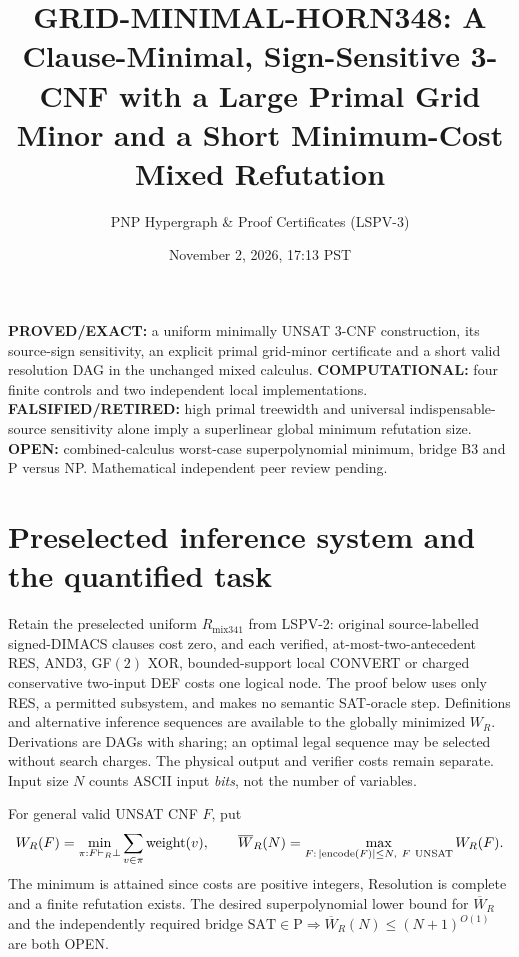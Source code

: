 \documentclass[11pt]{article}
\title{GRID-MINIMAL-HORN348: A Clause-Minimal, Sign-Sensitive 3-CNF with a Large Primal Grid Minor and a Short Minimum-Cost Mixed Refutation}
\author{PNP Hypergraph \& Proof Certificates (LSPV-3)}
\date{November 2, 2026, 17:13 PST}
\begin{document}
\maketitle
\noindent\textbf{PROVED/EXACT:} a uniform minimally UNSAT 3-CNF construction, its source-sign sensitivity, an explicit primal grid-minor certificate and a short valid resolution DAG in the unchanged mixed calculus. \textbf{COMPUTATIONAL:} four finite controls and two independent local implementations. \textbf{FALSIFIED/RETIRED:} high primal treewidth and universal indispensable-source sensitivity alone imply a superlinear global minimum refutation size. \textbf{OPEN:} combined-calculus worst-case superpolynomial minimum, bridge B3 and P versus NP. Mathematical independent peer review pending.

\section*{Preselected inference system and the quantified task}
Retain the preselected uniform $R_{\mathrm{mix341}}$ from LSPV-2: original source-labelled signed-DIMACS clauses cost zero, and each verified, at-most-two-antecedent RES, AND3, GF$(2)$ XOR, bounded-support local CONVERT or charged conservative two-input DEF costs one logical node. The proof below uses only RES, a permitted subsystem, and makes no semantic SAT-oracle step. Definitions and alternative inference sequences are available to the globally minimized $W_R$. Derivations are DAGs with sharing; an optimal legal sequence may be selected without search charges. The physical output and verifier costs remain separate. Input size $N$ counts ASCII input \emph{bits}, not the number of variables.

For general valid UNSAT CNF $F$, put
\[
W_R(F)=\min_{\pi:F\vdash_R\bot}\sum_{v\in\pi}\mathrm{weight}(v),\qquad
\overline W_R(N)=\max_{F:\,|{\rm encode}(F)|\le N,\ F\ {\rm UNSAT}}W_R(F).
\]
The minimum is attained since costs are positive integers, Resolution is complete and a finite refutation exists. The desired superpolynomial lower bound for $\overline W_R$ and the independently required bridge
$\mathrm{SAT}\in\mathrm P\Longrightarrow\overline W_R(N)\le(N+1)^{O(1)}$
are both OPEN.
\end{document}

